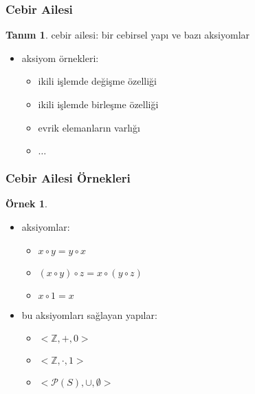 \documentclass[dvipsnames]{beamer}
\theoremstyle{definition}
\newtheorem{tanim}[theorem]{Tanım}
\theoremstyle{example}
\newtheorem{ornek}[theorem]{Örnek}
\theoremstyle{plain}
\begin{document}
\begin{frame}
  \frametitle{Cebir Ailesi}

  \begin{tanim}
    \alert{cebir ailesi}: bir cebirsel yapı ve bazı aksiyomlar
  \end{tanim}

  \begin{itemize}
    \item aksiyom örnekleri:
    \begin{itemize}
      \item ikili işlemde değişme özelliği
      \item ikili işlemde birleşme özelliği
      \item evrik elemanların varlığı
      \item $\ldots$
    \end{itemize}
  \end{itemize}
\end{frame}

\begin{frame}
  \frametitle{Cebir Ailesi Örnekleri}

  \begin{ornek}
    \begin{itemize}
      \item aksiyomlar:
      \begin{itemize}
        \item $x \circ y = y \circ x$
        \item $(x \circ y) \circ z = x \circ (y \circ z)$
        \item $x \circ 1 = x$
      \end{itemize}

      \pause
      \item bu aksiyomları sağlayan yapılar:
      \begin{itemize}
       \item $<\mathbb{Z},+,0>$
       \item $<\mathbb{Z},\cdot,1>$
       \item $<\mathcal{P}(S),\cup,\emptyset>$
      \end{itemize}
    \end{itemize}
  \end{ornek}
\end{frame}
\end{document}
